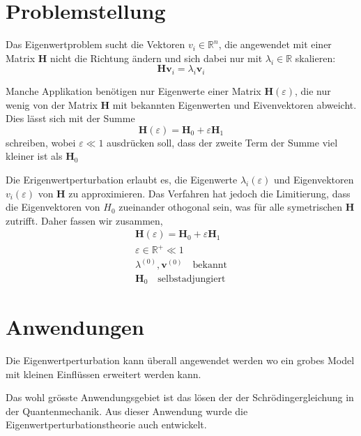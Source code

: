 %
%
%
\section{Problemstellung
\label{ew:section:problemstellung}}

Das Eigenwertproblem sucht die Vektoren $v_i \in \mathbb {R}^{n} $, die angewendet mit einer Matrix $\bm H$ nicht die Richtung ändern und sich dabei nur mit $\lambda_i \in \mathbb R$ skalieren:
\begin{equation} 
    \bm H \bm v_i = \lambda_i \bm v_i \label{ew:eq:eig}
\end{equation}

Manche Applikation benötigen nur Eigenwerte einer Matrix $\bm H(\varepsilon)$, die nur wenig von der Matrix $\bm H$ mit bekannten Eigenwerten und Eivenvektoren abweicht.
Dies lässt sich mit der Summe
\begin{equation}
    \bm H(\varepsilon) = \bm H_0 + \varepsilon \bm H_1
\end{equation}
schreiben, wobei $\varepsilon \ll 1 $ ausdrücken soll, dass der zweite Term der Summe viel kleiner ist als $\bm H_0$

Die Erigenwertperturbation erlaubt es, die Eigenwerte $\lambda_i(\varepsilon)$ und Eigenvektoren  $v_i(\varepsilon)$ von $\bm H$ zu approximieren.
Das Verfahren hat jedoch die Limitierung, dass die Eigenvektoren von $H_0$ zueinander othogonal sein, was für alle symetrischen $\bm H$ zutrifft.
Daher fassen wir zusammen,
\begin{gather*}
    \bm H(\varepsilon) = \bm H_0 + \varepsilon \bm H_1 \\
    \varepsilon \in \mathbb{R^+} \ll 1 \\
    \lambda^{(0)}, \bm v^{(0)} \quad \text{bekannt} \\
    \bm H_0 \quad \text{selbstadjungiert}
\end{gather*} %

\section{Anwendungen}

Die Eigenwertperturbation kann überall angewendet werden wo ein grobes Model mit kleinen Einflüssen erweitert werden kann.

Das wohl grösste Anwendungsgebiet ist das lösen der der Schrödingergleichung in der Quantenmechanik.
Aus dieser Anwendung wurde die Eigenwertperturbationstheorie auch entwickelt. %
                
